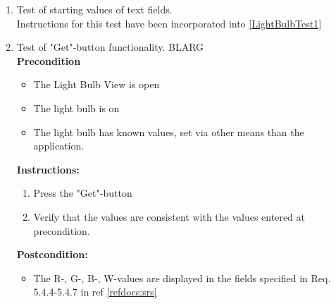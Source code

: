 \documentclass[a4paper]{article}
\newlength{\testlabellength}
\newenvironment{testlist}{\begin{enumerate}[label=\bfseries Instruction \thesubsection.\arabic* , labelindent=0pt, labelwidth=\testlabellength , leftmargin=2cm]}{\end{enumerate}}
\newenvironment{precondition}{
{\color{white}BLARG}\\ 
\textbf{Precondition}
\begin{itemize}[labelindent=0cm, labelwidth=2cm , leftmargin=1cm]
}
{\end{itemize}}
\newenvironment{instruction}{
\textbf{Instructions:}
\begin{enumerate}[label=\bfseries  \arabic*., labelindent=0cm, labelwidth=2cm , leftmargin=1cm]
}
{\end{enumerate}}
\newenvironment{postcondition}{
\textbf{Postcondition:}
\begin{itemize}[labelindent=0cm, labelwidth=2cm , leftmargin=1cm]
}
{\end{itemize}}
\begin{document}
\begin{appendices}
\begin{testlist}

	\item Test of starting values of text fields.\\
		Instructions for this test have been incorporated into \ref{LightBulbTest1}  

	\item Test of "Get"-button functionality.
		\begin{precondition}
			\item The Light Bulb View is open
			\item The light bulb is on
			\item The light bulb has known values, set via other means than the application.
		\end{precondition}
		\begin{instruction}
			\item Press the "Get"-button
			\item Verify that the values are consistent with the values entered at precondition.
		\end{instruction}
		\begin{postcondition}
			\item The R-, G-, B-, W-values are displayed in the fields specified in Req. 5.4.4-5.4.7 in ref \ref{refdocs:srs}
		\end{postcondition}

\newpage


\end{testlist}
\end{appendices}
\end{document}
